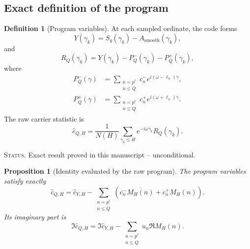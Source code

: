 \documentclass[11pt]{amsart}
\numberwithin{equation}{section}
\theoremstyle{plain}
\newtheorem{proposition}[theorem]{Proposition}
\theoremstyle{definition}
\newtheorem{definition}[theorem]{Definition}
\theoremstyle{remark}
\newcommand{\1}{\mathbf{1}}
\newcommand{\statusnote}[1]{%
  \par\smallskip\noindent
  \begingroup\footnotesize\textsc{Status.} #1\endgroup
  \par\smallskip}
\begin{document}
\subsection{Exact definition of the program}
\label{subsec:exact_program_definition}

\begin{definition}[Program variables]
\label{def:numerical_program_variables}
At each sampled ordinate, the code forms
\begin{equation}
Y(\gamma_k)
=
S_q(\gamma_k)-A_{\mathrm{smooth}}(\gamma_k),
\label{eq:numerical_Y_program}
\end{equation}
and
\begin{equation}
R_Q(\gamma_k)
=
Y(\gamma_k)-P_Q^-(\gamma_k)-P_Q^+(\gamma_k),
\label{eq:numerical_RQ_program}
\end{equation}
where
\begin{align}
P_Q^-(\gamma)
&=
\sum_{\substack{n=p^r\\n\leq Q}}
 c_n^-e^{i(\omega-\ell_n)\gamma},
\label{eq:numerical_PQ_minus}
\\
P_Q^+(\gamma)
&=
\sum_{\substack{n=p^r\\n\leq Q}}
 c_n^+e^{i(\omega+\ell_n)\gamma}.
\label{eq:numerical_PQ_plus}
\end{align}
The raw carrier statistic is
\begin{equation}
\widehat c_{Q,H}
=
\frac1{N(H)}
\sum_{\gamma_k\leq H}
e^{-i\omega\gamma_k}R_Q(\gamma_k).
\label{eq:numerical_raw_carrier}
\end{equation}
\end{definition}

\statusnote{Exact result proved in this manuscript -- unconditional.}
\begin{proposition}[Identity evaluated by the raw program]
\label{prop:numerical_raw_identity}
The program variables satisfy exactly
\begin{equation}
\widehat c_{Q,H}
=
\widehat c_{Y,H}
-
\sum_{\substack{n=p^r\\n\leq Q}}
\left(c_n^-\overline{M_H(n)}+c_n^+M_H(n)\right).
\label{eq:numerical_raw_identity}
\end{equation}
Its imaginary part is
\begin{equation}
\Im\widehat c_{Q,H}
=
\Im\widehat c_{Y,H}
-
\sum_{\substack{n=p^r\\n\leq Q}}
u_n\Re M_H(n).
\label{eq:numerical_imag_identity}
\end{equation}
\end{proposition}
\end{document}
